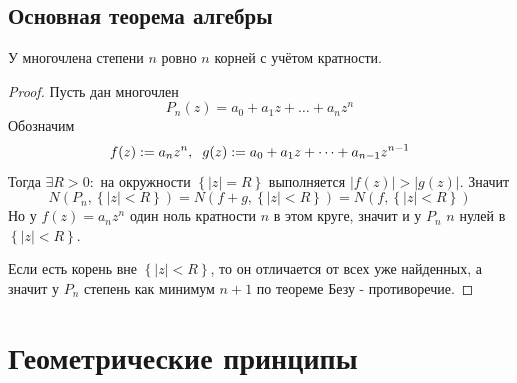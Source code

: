 \subsection{Основная теорема алгебры}
\begin{theorem}
  У многочлена степени $n$ ровно $n$ корней с учётом кратности. 
\end{theorem}
\begin{proof}
  Пусть дан многочлен
  \[P_n(z) = a_0+a_1z+\dots+a_nz^n\]
  Обозначим
  \[f(z):=a_nz^n,\hspace{0.2cm} g(z) := a_0+a_1z+\dots+a_{n-1}z^{n-1}\]
  Тогда $\exists R > 0\colon$ на окружности $\left\{|z|=R\right\}$ выполняется $|f(z)|>|g(z)|$. Значит
  \[N(P_n, \left\{|z|<R\right\}) = N(f+g, \left\{|z|<R\right\}) = N(f, \left\{|z|<R\right\})\]
  Но у $f(z) = a_nz^n$ один ноль кратности $n$ в этом круге, значит и у $P_n$ $n$ нулей в $\left\{|z|<R\right\}$. 

  Если есть корень вне $\left\{|z|<R\right\}$, то он отличается от всех уже найденных, а значит у $P_n$ степень как минимум $n+1$ по теореме Безу - противоречие. 
\end{proof}
\section{Геометрические принципы}

